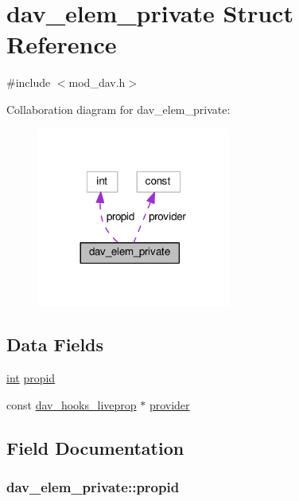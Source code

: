 \hypertarget{structdav__elem__private}{}\section{dav\+\_\+elem\+\_\+private Struct Reference}
\label{structdav__elem__private}


{\ttfamily \#include $<$mod\+\_\+dav.\+h$>$}



Collaboration diagram for dav\+\_\+elem\+\_\+private\+:
\nopagebreak
\begin{figure}[H]
\begin{center}
\leavevmode
\includegraphics[width=180pt]{structdav__elem__private__coll__graph}
\end{center}
\end{figure}
\subsection*{Data Fields}
\begin{DoxyCompactItemize}
\item 
\hyperlink{pcre_8txt_a42dfa4ff673c82d8efe7144098fbc198}{int} \hyperlink{structdav__elem__private_a36755d8669f1064c343a127e8e13ed99}{propid}
\item 
const \hyperlink{structdav__hooks__liveprop}{dav\+\_\+hooks\+\_\+liveprop} $\ast$ \hyperlink{structdav__elem__private_a5e9b2bd2455d88e29e87f04e495adf1c}{provider}
\end{DoxyCompactItemize}


\subsection{Field Documentation}
\subsubsection[{\texorpdfstring{propid}{propid}}]{ dav\+\_\+elem\+\_\+private\+::propid}\hypertarget{structdav__elem__private_a36755d8669f1064c343a127e8e13ed99}{}\label{structdav__elem__private_a36755d8669f1064c343a127e8e13ed99}
